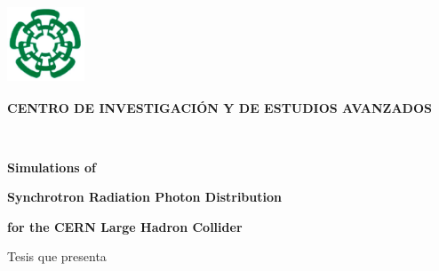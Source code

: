 \documentclass[12pt,letterpaper,spanish,openrigth,twoside]{book}%
\newcommand{\bs}{\bigskip}
\begin{document}
\renewcommand{\thepage}{\roman{page}}
\hspace{-2.9cm}
\begin{minipage}{2.3cm}\vspace{-6.0 cm}
\includegraphics [width=2.3cm,height=2.3cm]{logo.pdf}
\end{minipage}
\begin{center}
\vspace{-4.6cm} \begin{large}
{\bf \hspace{-1.2cm}\textsf{CENTRO DE INVESTIGACIÓN Y DE ESTUDIOS AVANZADOS}}\\   \end{large}
\\ 
\end{center}

\bs\bs\bs\bs
\begin{center}
 {\large \bf \bs \bf \hspace{-2.8cm}\textsf{Simulations of} }
\end{center}
\begin{center}
 {\large \bf \bs \bf \hspace{-2.8cm}\textsf{Synchrotron Radiation Photon Distribution} }
\end{center}
\begin{center} {\large \bf \bs \bf \hspace{-2.8cm}\textsf{for the CERN Large Hadron Collider}}
\end{center}\bs\bs\bs 
 \begin{center}
{\large \hspace{-2.8cm}\textsf{Tesis que presenta}}
\end{center}\bs
\end{document}
